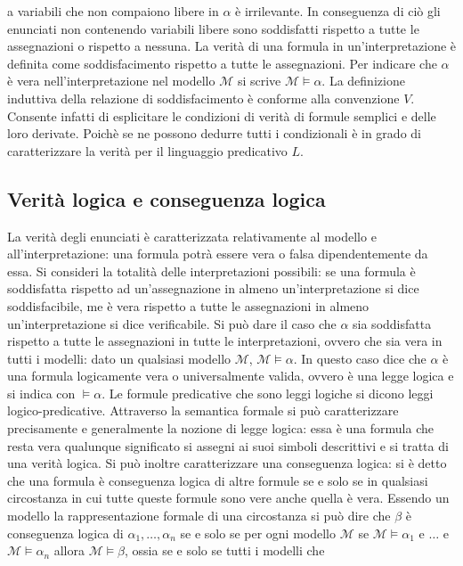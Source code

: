 a variabili che non compaiono libere in $\alpha$ \`e irrilevante. In conseguenza di ci\`o gli enunciati non contenendo variabili libere sono soddisfatti rispetto a tutte le assegnazioni o rispetto a nessuna.  La 
verit\`a di una formula in un'interpretazione \`e definita come soddisfacimento rispetto a tutte le assegnazioni. Per indicare che $\alpha$ \`e vera nell'interpretazione nel modello $\mathcal{M}$ si scrive $
\mathcal{M}\models\alpha$. La definizione induttiva della relazione di soddisfacimento \`e conforme alla convenzione $V$. Consente infatti di esplicitare le condizioni di verit\`a di formule semplici e delle loro 
derivate. Poich\`e se ne possono dedurre tutti i condizionali \`e in grado di caratterizzare la verit\`a per il linguaggio predicativo $L$. 
\subsection{Verit\`a logica e conseguenza logica}
La verit\`a degli enunciati \`e caratterizzata relativamente al modello e all'interpretazione: una formula potr\`a essere vera o falsa dipendentemente da essa. Si consideri la totalit\`a delle interpretazioni possibili: 
se una formula \`e soddisfatta rispetto ad un'assegnazione in almeno un'interpretazione si dice soddisfacibile, me \`e vera rispetto a tutte le assegnazioni in almeno un'interpretazione si dice verificabile. Si pu\`o 
dare il caso che $\alpha$ sia soddisfatta rispetto a tutte le assegnazioni in tutte le interpretazioni, ovvero che sia vera in tutti i modelli: dato un qualsiasi modello $\mathcal{M}$, $\mathcal{M}\models\alpha$. 
In questo caso dice che $\alpha$ \`e una formula logicamente vera o universalmente valida, ovvero \`e una legge logica e si indica con $\models\alpha$. Le formule predicative che sono leggi logiche si dicono 
leggi logico-predicative. Attraverso la semantica formale si pu\`o caratterizzare precisamente e generalmente la nozione di legge logica: essa \`e una formula che resta vera qualunque significato si assegni ai 
suoi simboli descrittivi e si tratta di una verit\`a logica. Si pu\`o inoltre caratterizzare una conseguenza logica: si \`e detto che una formula \`e conseguenza logica di altre formule se e solo se in qualsiasi 
circostanza in cui tutte queste formule sono vere anche quella \`e vera. Essendo un modello la rappresentazione formale di una circostanza si pu\`o dire che $\beta$ \`e conseguenza logica di $\alpha_1, \dots, 
\alpha_n$ se e solo se per ogni modello $\mathcal{M}$ se $\mathcal{M}\models\alpha_1$ e $\dots$ e $\mathcal{M}\models\alpha_n$ allora $\mathcal{M}\models\beta$, ossia se e solo se tutti i modelli che 
